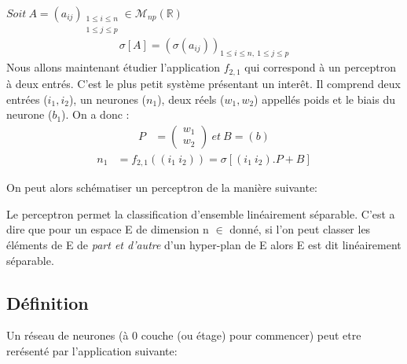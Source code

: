 \documentclass[12pt]{article}
\begin{document}
$Soit \ A = (a_{ij})_{\substack{1 \leqslant i \leqslant n \\ 1 \leqslant j \leqslant p}} \in \mathcal{M}_{np}(\mathds{R})$
\begin{align}
\sigma [A] = ( \sigma (a_{ij}))_{1 \leqslant i \leqslant n ,\ 1 \leqslant j \leqslant p}
\end{align}
Nous allons maintenant étudier l'application $f_{2,1}$ qui correspond à un perceptron à deux entrés. C'est le plus petit système présentant un interêt. Il comprend deux entrées ($i_1, i_2$), un neurones ($n_1$), deux réels ($w_1, w_2$) appellés poids et le biais du neurone ($b_1$). On a donc : 
\begin{align*}
P &= \begin{pmatrix}{w_1}\\{w_2}\end{pmatrix} \ et \ B = (b)
\end{align*}
\begin{align}
n_1 &= f_{2,1} ( (i_1 \ i_2) ) = \sigma \left[(i_1 \ i_2).P +  B\right]
\end{align}

On peut alors schématiser un perceptron de la manière suivante:



Le perceptron permet la classification d'ensemble linéairement séparable. C'est a dire que pour un espace E de dimension n $\in$ donné, si l'on peut classer les éléments de E de \textit{part et d'autre} d'un hyper-plan de E alors E est dit linéairement séparable.



\subsection{Définition}\label{subsection: \thesubsection}


Un réseau de neurones (à 0 couche (ou étage) pour commencer) peut etre rerésenté par l'application suivante:
\end{document}
